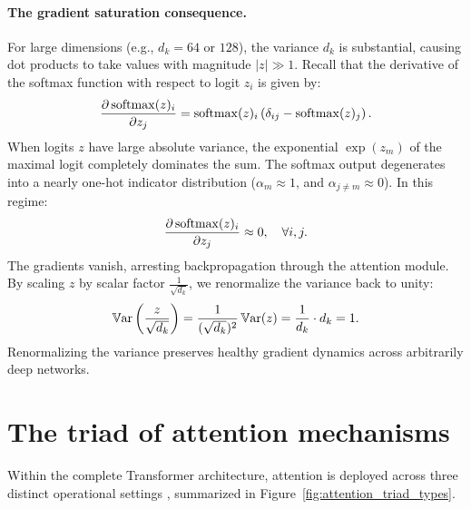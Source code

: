\documentclass[../../main.tex]{subfiles}
\begin{document}
\paragraph{The gradient saturation consequence.}
For large dimensions (e.g., $d_k = 64$ or $128$), the variance $d_k$ is substantial, causing dot products to take values with magnitude $|z| \gg 1$.
Recall that the derivative of the softmax function with respect to logit $z_i$ is given by:
\begin{equation}
\label{eq:softmax_derivative}
\frac{\partial \operatorname{\mathrm{softmax}}(z)_i}{\partial z_j} = \operatorname{\mathrm{softmax}}(z)_i \left(\delta_{ij} - \operatorname{\mathrm{softmax}}(z)_j\right).
\end{equation}
When logits $z$ have large absolute variance, the exponential $\exp(z_m)$ of the maximal logit completely dominates the sum. The softmax output degenerates into a nearly one-hot indicator distribution ($\alpha_m \approx 1$, and $\alpha_{j \ne m} \approx 0$). In this regime:
\begin{equation}
\frac{\partial \operatorname{\mathrm{softmax}}(z)_i}{\partial z_j} \approx 0, \quad \forall i, j.
\end{equation}
The gradients vanish, arresting backpropagation through the attention module.
By scaling $z$ by scalar factor $\frac{1}{\sqrt{d_k}}$, we renormalize the variance back to unity:
\begin{equation}
\label{eq:variance_scaled_dot_product}
\operatorname{\mathbb{V}\mathrm{ar}}\left(\frac{z}{\sqrt{d_k}}\right) = \frac{1}{(\sqrt{d_k})^2}\operatorname{\mathbb{V}\mathrm{ar}}(z) = \frac{1}{d_k} \cdot d_k = 1.
\end{equation}
Renormalizing the variance preserves healthy gradient dynamics across arbitrarily deep networks.

\clearpage
\section{The triad of attention mechanisms}
\label{sec:triad_of_attention}

Within the complete Transformer architecture, attention is deployed across three distinct operational settings \cite{vaswani2017}, summarized in Figure~\ref{fig:attention_triad_types}.
\end{document}
